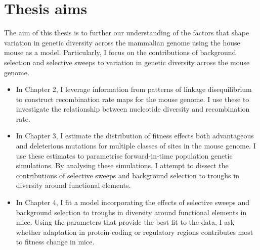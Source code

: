 \section[Thesis aims]{Thesis aims}

	The aim of this thesis is to further our understanding of the factors that shape variation in genetic diversity across the mammalian genome using the house mouse as a model. Particularly, I focus on the contributions of background selection and selective sweeps to variation in genetic diversity across the mouse genome. 

	\begin{itemize}
	
	\item In Chapter 2, I leverage information from patterns of linkage disequilibrium to construct recombination rate maps for the mouse genome. I use these to investigate the relationship between nucleotide diversity and recombination rate. 
	
	\item In Chapter 3, I estimate the distribution of fitness effects both advantageous and deleterious mutations for multiple classes of sites in the mouse genome. I use these estimates to parametrise forward-in-time population genetic simulations. By analysing these simulations, I attempt to dissect the contributions of selective sweeps and background selection to troughs in diversity around functional elements.
	
	\item In Chapter 4, I fit a model incorporating the effects of selective sweeps and background selection to troughs in diversity around functional elements in mice. Using the parameters that provide the best fit to the data, I ask whether adaptation in protein-coding or  regulatory regions contributes most to fitness change in mice.
	
	\end{itemize}

